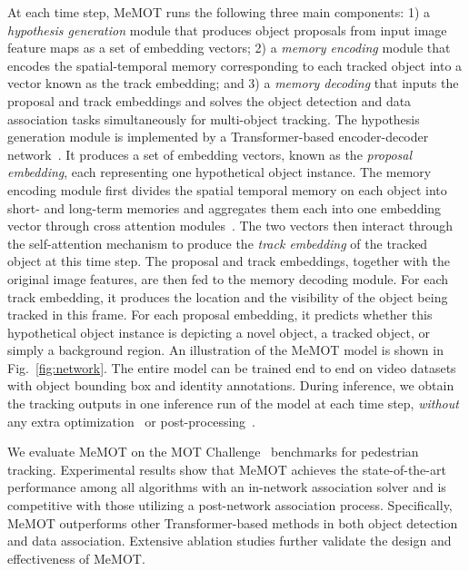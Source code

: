 At each time step, MeMOT runs the following three main components:
1) a \textit{hypothesis generation} module that produces object proposals from input image feature maps as a set of embedding vectors;
2) a \textit{memory encoding} module that encodes the spatial-temporal memory corresponding to each tracked object into a vector known as the track embedding;
and 3) a \textit{memory decoding} that inputs the proposal and track embeddings and solves the object detection and data association tasks simultaneously for multi-object tracking.
The hypothesis generation module is implemented by a Transformer-based encoder-decoder network~\cite{carion2020end,zhu2020deformable}.
It produces a set of embedding vectors, known as the \emph{proposal embedding}, each representing one hypothetical object instance. 
The memory encoding module first divides the spatial temporal memory on each object into short- and long-term memories and aggregates them each into one embedding vector through cross attention modules~\cite{vaswani2017attention}. The two vectors then interact through the self-attention mechanism to produce the \emph{track embedding} of the tracked object at this time step. 
The proposal and track embeddings, together with the original image features, are then fed to the memory decoding module.
For each track embedding, it produces the location and the visibility of the object being tracked in this frame. For each proposal embedding, it predicts whether this hypothetical object instance is depicting a novel object, a tracked object, or simply a background region. 
An illustration of the MeMOT model is shown in Fig.~\ref{fig:network}.
The entire model can be trained end to end on video datasets with object bounding box and identity annotations.
During inference, we obtain the tracking outputs in one inference run of the model at each time step, \emph{without} any extra optimization~\cite{rangesh2021trackmpnn, chu2021transmot} or post-processing~\cite{sun2020transtrack, bergmann2019tracking, zhang2020fair}. 

We evaluate MeMOT on the MOT Challenge~\cite{milan2016mot16,dendorfer2020mot20} benchmarks for pedestrian tracking.
Experimental results show that MeMOT achieves the state-of-the-art performance among all algorithms with an in-network association solver and is competitive with those utilizing a post-network association process.
Specifically, MeMOT outperforms other Transformer-based methods in both object detection and data association.
Extensive ablation studies further validate the design and effectiveness of MeMOT.
